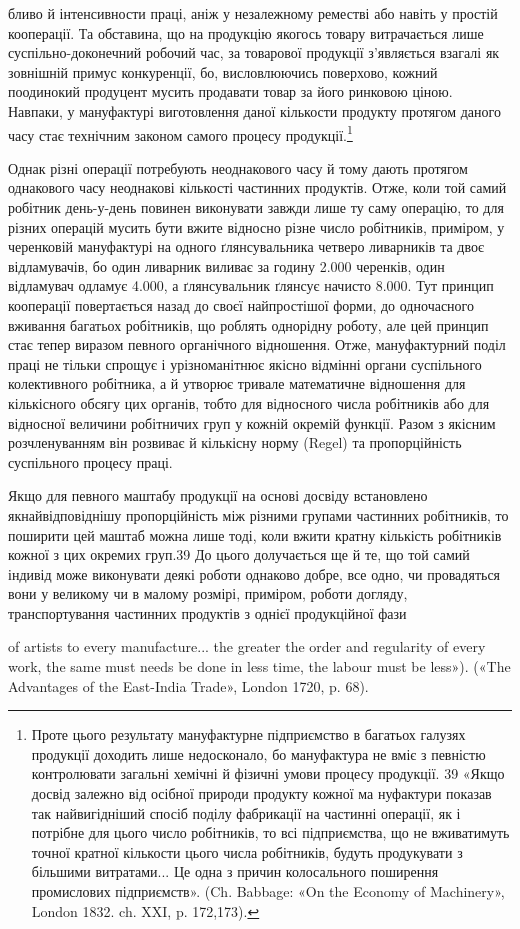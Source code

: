 бливо й інтенсивности праці, аніж у незалежному реместві або
навіть у простій кооперації. Та обставина, що на продукцію
якогось товару витрачається лише суспільно-доконечний робочий
час, за товарової продукції з’являється взагалі як зовнішній
примус конкуренції, бо, висловлюючись поверхово, кожний
поодинокий продуцент мусить продавати товар за його ринковою
ціною. Навпаки, у мануфактурі виготовлення даної кількости
продукту протягом даного часу стає технічним законом самого
процесу продукції.\footnote{
Проте цього результату мануфактурне підприємство в багатьох
галузях продукції доходить лише недосконало, бо мануфактура не вміє
з певністю контролювати загальні хемічні й фізичні умови процесу продукції.
39 «Якщо досвід залежно від осібної природи продукту кожної ма
нуфактури показав так найвигідніший спосіб поділу фабрикації на
частинні операції, як і потрібне для цього число робітників, то всі підприємства,
що не вживатимуть точної кратної кількости цього числа
робітників, будуть продукувати з більшими витратами... Це одна з
причин колосального поширення промислових підприємств». (Ch. Babbage:
«On the Economy of Machinery», London 1832. ch. XXI, p. 172,173).
}

 Однак різні операції потребують неоднакового часу й тому
дають протягом однакового часу неоднакові кількості частинних
продуктів. Отже, коли той самий робітник день-у-день повинен
виконувати завжди лише ту саму операцію, то для різних
операцій мусить бути вжите відносно різне число робітників,
приміром, у черенковій мануфактурі на одного ґлянсувальника
четверо ливарників та двоє відламувачів, бо один ливарник виливає
за годину 2.000 черенків, один відламувач одламує 4.000, а
ґлянсувальник ґлянсує начисто 8.000. Тут принцип кооперації
повертається назад до своєї найпростішої форми, до одночасного
вживання багатьох робітників, що роблять однорідну роботу,
але цей принцип стає тепер виразом певного органічного відношення.
Отже, мануфактурний поділ праці не тільки спрощує
і урізноманітнює якісно відмінні органи суспільного колективного
робітника, а й утворює тривале математичне відношення
для кількісного обсягу цих органів, тобто для відносного числа
робітників або для відносної величини робітничих груп у кожній
окремій функції. Разом з якісним розчленуванням він розвиває
й кількісну норму (Regel) та пропорційність суспільного процесу
праці.

Якщо для певного маштабу продукції на основі досвіду встановлено
якнайвідповіднішу пропорційність між різними групами
частинних робітників, то поширити цей маштаб можна лише тоді,
коли вжити кратну кількість робітників кожної з цих окремих
груп.39 До цього долучається ще й те, що той самий індивід може
виконувати деякі роботи однаково добре, все одно, чи провадяться
вони у великому чи в малому розмірі, приміром, роботи догляду,
транспортування частинних продуктів з однієї продукційної фази

of artists to every manufacture... the greater the order and regularity of
every work, the same must needs be done in less time, the labour must
be less»). («The Advantages of the East-India Trade», London 1720, p. 68).